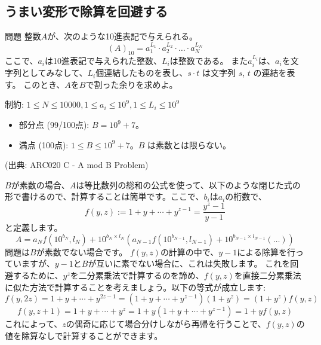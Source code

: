 \documentclass{jsarticle}
\begin{document}
  \subsection{うまい変形で除算を回避する}
  \label{subsec:avoiding-division}
  \begin{itembox}[l]{問題}
   整数$A$が、次のような10進表記で与えられる。
   \begin{displaymath}
    (A)_{10} = a_1^{L_1} \cdot a_2^{L_2} \cdot \dots \cdot a_N^{L_N}
   \end{displaymath}
   ここで、$a_i$は10進表記で与えられた整数、$L_i$は整数である。
   また$a_i^{L_i}$は、$a_i$を文字列としてみなして、$L_i$個連結したものを表し、$s \cdot t$ は文字列 $s$, $t$ の連結を表す。
   このとき、$A$を$B$で割った余りを求めよ。

   制約: $1 \le N \le 10000, 1\le a_i \le 10^9, 1 \le L_i \le 10^9$
   \begin{itemize}
    \item 部分点 (99/100点): $B = 10^9+7$。
    \item 満点 (100点): $1 \le B \le 10^9 + 7$。$B$ は素数とは限らない。
   \end{itemize}

   (出典: ARC020 C - A mod B Problem)
  \end{itembox}
  $B$が素数の場合、$A$は等比数列の総和の公式を使って、以下のような閉じた式の形で書けるので、計算することは簡単です。ここで、$b_i$は$a_i$の桁数で、
  \begin{displaymath}
   f(y,z) := 1+y+\cdots+y^{z-1} = \frac{y^z-1}{y-1}
  \end{displaymath}
  と定義します。
  \begin{displaymath}
   A = a_N f(10^{b_N},l_N)+10^{b_N \times l_N}(a_{N-1}f(10^{b_{N-1}},l_{N-1}) + 10^{b_{N-1} \times l_{N-1}} ( \ldots))
  \end{displaymath}
  問題は$B$が素数でない場合です。
  $f(y,z)$の計算の中で、$y-1$による除算を行っていますが、$y-1$と$B$が互いに素でない場合に、これは失敗します。
  これを回避するために、$y^z$を二分累乗法で計算するのを諦め、$f(y,z)$を直接二分累乗法に似た方法で計算することを考えましょう。以下の等式が成立します:
  \begin{displaymath}
   f(y,2z) = 1+y+\cdots+y^{2z-1}=(1+y+\cdots+y^{z-1})(1+y^z)=(1+y^z)f(y,z)
  \end{displaymath}
  \begin{displaymath}
   f(y,z+1)=1+y+\cdots+y^{z}=1+y(1+y+\cdots+y^{z-1})=1+yf(y,z)
  \end{displaymath}
  これによって、$z$の偶奇に応じて場合分けしながら再帰を行うことで、$f(y,z)$の値を除算なしで計算することができます。
\end{document}
